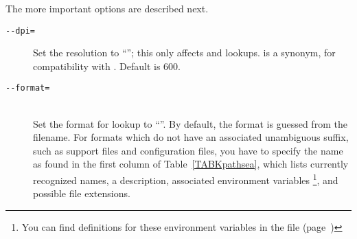 \documentclass{article}
\begin{document}
The more important options are described next.

\begin{description}
\item[\texttt{-{}-dpi=}]\mbox{} 
  Set the resolution to ``\texttt{}''; this only affects 
  and  lookups.   is a synonym, for compatibility
  with .  Default is 600.
\item[\texttt{-{}-format=}]\mbox{}\\
  Set the format for lookup to ``\texttt{}''.  By default, the
  format is guessed from the filename. For formats which do not have
  an associated unambiguous suffix, such as \MP{} support files and
   configuration files, you have to specify the name as
  found in the first column of Table~\ref{TABKpathsea}, which lists
  currently recognized names, a description, 
  associated environment variables%
  \footnote{You can find definitions for these environment variables
    in the file  (page~\pageref{app:texmf.cnf})}, and
  possible file extensions.
\end{description}
\end{document}
